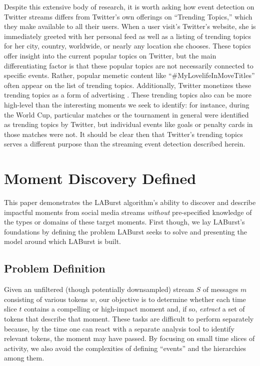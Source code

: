 \documentclass[letterpaper]{article}
\begin{document}
Despite this extensive body of research, it is worth asking how event detection on Twitter streams differs from Twitter's own offerings on ``Trending Topics,'' which they make available to all their users.
When a user visit's Twitter's website, she is immediately greeted with her personal feed as well as a listing of trending topics for her city, country, worldwide, or nearly any location she chooses.
These topics offer insight into the current popular topics on Twitter, but the main differentiating factor is that these popular topics are not necessarily connected to specific events.
Rather, popular memetic content like ``\#MyLovelifeInMoveTitles'' often appear on the list of trending topics.
Additionally, Twitter monetizes these trending topics as a form of advertising \cite{Sydell2011}.  
These trending topics also can be more high-level than the interesting moments we seek to identify: for instance, during the World Cup, particular matches or the tournament in general were identified as trending topics by Twitter, but individual events like goals or penalty cards in those matches were not.
It should be clear then that Twitter's trending topics serves a different purpose than the streaming event detection described herein.

\section{Moment Discovery Defined}
\label{sect:model}

This paper demonstrates the LABurst algorithm's ability to discover and describe impactful moments from social media streams \emph{without} pre-specified knowledge of the types or domains of these target moments.
First though, we lay LABurst's foundations by defining the problem LABurst seeks to solve and presenting the model around which LABurst is built.

\subsection{Problem Definition}

Given an unfiltered (though potentially downsampled) stream $S$ of messages $m$ consisting of various tokens $w$, our objective is to determine whether each time slice $t$ contains a compelling or high-impact moment and, if so, \emph{extract} a set of tokens that describe that moment.
These tasks are difficult to perform separately because, by the time one can react with a separate analysis tool to identify relevant tokens, the moment may have passed.
By focusing on small time slices of activity, we also avoid the complexities of defining ``events'' and the hierarchies among them.
\end{document}
